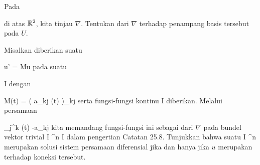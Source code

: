 {}
{

Pada

 di atas ${\mathbb R}^2$, kita tinjau
$\nabla$.
 {Tentukan
dari $\nabla$ terhadap penampang basis tersebut pada $U$.
}

}
{} {}

{}
{

Misalkan diberikan suatu

\mavergleichskettedisp
{\vergleichskette
{ u'
}
{ =} { Mu
}
{ } {
}
{ } {
}
{ } {
}
}
{}{}{}
pada suatu

\mavergleichskette
{\vergleichskette
{ I
}
{ \subseteq }{ \R
}
{  }{
}
{    }{
}
{   }{
}
}
{}{}{}
dengan

\mavergleichskettedisp
{\vergleichskette
{ M(t)
}
{ =} { \left(  a_{kj} (t)  \right)_{kj}
}
{ } {
}
{ } {
}
{ } {
}
}
{}{}{}
 {} {}
serta fungsi-fungsi kontinu
 { I } {\R
} {}
diberikan.
Melalui persamaan

\mavergleichskettedisp
{\vergleichskette
{ \Gamma_{j}^k (t)
}
{ } { -a_{kj}
}
{ } {
}
{ } {
}
{ } {
}
}
{}{}{}
kita memandang fungsi-fungsi ini sebagai
 {} {}
dari
$\nabla$ pada bundel vektor trivial
 {I \times \R^n } { I
} {}
dalam pengertian
Catatan 25.8.
Tunjukkan bahwa suatu
 { I } { \R^n
} {}
merupakan solusi sistem persamaan diferensial jika dan hanya jika $u$ merupakan
terhadap koneksi tersebut.

}
{} {}

